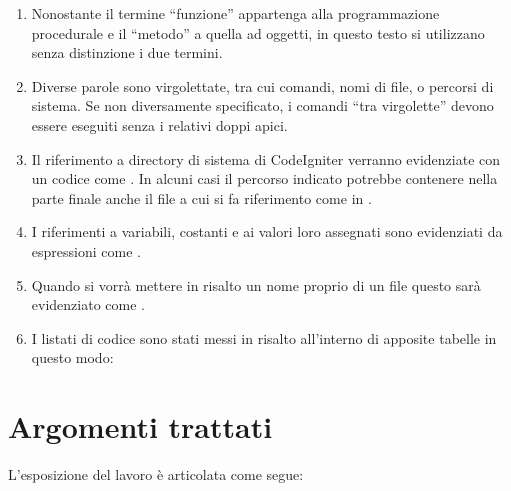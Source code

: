 \begin{enumerate}
\item Nonostante il termine ``funzione'' appartenga alla programmazione procedurale e il ``metodo'' a quella ad oggetti, in questo testo si utilizzano senza distinzione i due termini.
\item Diverse parole sono virgolettate, tra cui comandi, nomi di file, o percorsi di sistema. Se non diversamente specificato, i comandi ``tra virgolette'' devono essere eseguiti senza i relativi doppi apici.
\item Il riferimento a directory di sistema di CodeIgniter verranno evidenziate con un codice come . In alcuni casi il percorso indicato potrebbe contenere nella parte finale anche il file a cui si fa riferimento come in .
\item I riferimenti a variabili, costanti e ai valori loro assegnati sono evidenziati da espressioni come .
\item Quando si vorrà mettere in risalto un nome proprio di un file questo sarà evidenziato come .
\item I listati di codice sono stati messi in risalto all'interno di apposite tabelle in questo modo:

\end{enumerate}

\section*{Argomenti trattati}
L'esposizione del lavoro è articolata come segue:

